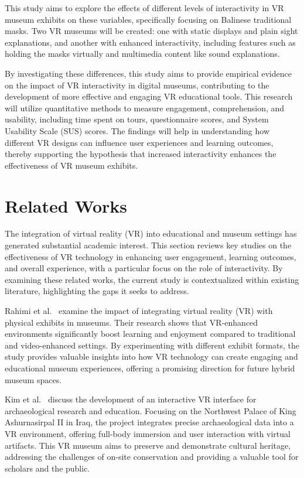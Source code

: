 \documentclass[conference]{IEEEtran}
\begin{document}
This study aims to explore the effects of different levels of interactivity in VR museum exhibits on these variables, specifically focusing on Balinese traditional masks. Two VR museums will be created: one with static displays and plain sight explanations, and another with enhanced interactivity, including features such as holding the masks virtually and multimedia content like sound explanations.

By investigating these differences, this study aims to provide empirical evidence on the impact of VR interactivity in digital museums, contributing to the development of more effective and engaging VR educational tools. This research will utilize quantitative methods to measure engagement, comprehension, and usability, including time spent on tours, questionnaire scores, and System Usability Scale (SUS) scores. The findings will help in understanding how different VR designs can influence user experiences and learning outcomes, thereby supporting the hypothesis that increased interactivity enhances the effectiveness of VR museum exhibits.

\section{Related Works}
The integration of virtual reality (VR) into educational and museum settings has generated substantial academic interest. This section reviews key studies on the effectiveness of VR technology in enhancing user engagement, learning outcomes, and overall experience, with a particular focus on the role of interactivity. By examining these related works, the current study is contextualized within existing literature, highlighting the gaps it seeks to address.

Rahimi et al.~\cite{9286680} examine the impact of integrating virtual reality (VR) with physical exhibits in museums. Their research shows that VR-enhanced environments significantly boost learning and enjoyment compared to traditional and video-enhanced settings. By experimenting with different exhibit formats, the study provides valuable insights into how VR technology can create engaging and educational museum experiences, offering a promising direction for future hybrid museum spaces.

Kim et al.~\cite{6797425} discuss the development of an interactive VR interface for archaeological research and education. Focusing on the Northwest Palace of King Ashurnasirpal II in Iraq, the project integrates precise archaeological data into a VR environment, offering full-body immersion and user interaction with virtual artifacts. This VR museum aims to preserve and demonstrate cultural heritage, addressing the challenges of on-site conservation and providing a valuable tool for scholars and the public.
\end{document}
